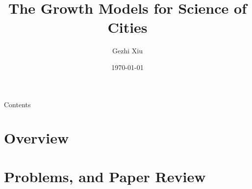 \documentclass{beamer}
\title[Growth Models]{The Growth Models for Science of Cities}
\author[G. Xiu]{Gezhi Xiu} %
\institute[IRSGIS PKU]{Complexity Research Group,\\Peking University}
\date[\today]{\today}
\begin{document}
\maketitle
\begin{frame}{Contents}
\tableofcontents
\end{frame}

\section{Overview}

\section{Problems, and Paper Review}





\end{document}
